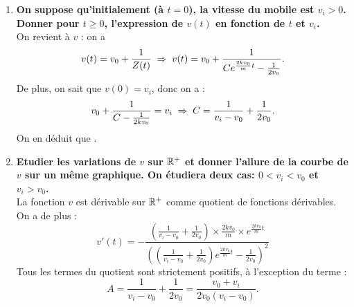 \documentclass[a4paper, 11pt,reqno]{article}
\begin{document}
\begin{correction}
\begin{enumerate}
$$\begin{array}{crcll}
\end{array}$$
On a donc $Z$ solution de l'\'equation diff\'erentielle lin\'eaire d'ordre 1 \`a coefficient constants suivante : 
$$ \ddp Z' - \frac{2kv_0}{m} Z  =  \frac{k}{m}.$$
\begin{itemize}
\item[$\star$] R\'esolution de l'\'equation homog\`ene associ\'ee : $ \ddp Z' - \frac{2kv_0}{m} Z = 0$. La solution est de la forme $Z_h(t) = C e^{\frac{2kv_0}{m}t}$, avec $C\in \R$. %
\item[$\star$] Recherche d'une solution particuli\`ere. Le second membre est constant, on cherche une solution sous la forme $Z_p(t) = \alpha$. On remplace dans l'\'equation, et on obtient :
$$-\frac{2k v_0}{m} \alpha = \frac{k}{m} \; \Rightarrow \; \alpha = -\frac{1}{2v_0}.$$
\item[$\star$] On en d\'eduit que la solution g\'en\'erale est donn\'ee par , avec $C \in \R$.
\end{itemize}
\item \textbf{On suppose qu'initialement (\`a $t=0$), la vitesse du mobile est $v_i>0$. Donner pour $t\geq 0$, l'expression de $v(t)$ en fonction de $t$ et $v_i$.}\\
On revient \`a $v$ : on a 
$$v(t) = v_0 + \displaystyle \frac{1}{Z(t)} \; \Rightarrow \; v(t) = v_0 + \frac{1}{C e^{\frac{2kv_0}{m}t} - \frac{1}{2v_0}}.$$
De plus, on sait que $v(0)= v_i$, donc on a :
$$v_0 + \frac{1}{C - \frac{1}{2kv_0}} = v_i \; \Rightarrow \; C = \displaystyle \frac{1}{v_i-v_0} + \frac{1}{2v_0}.$$
On en d\'eduit que .
\item \textbf{Etudier les variations de $v$ sur $\mathbb{R}^+$ et donner l'allure de la courbe de $v$ sur un m\^eme graphique. On \'etudiera deux cas: $0<v_i<v_0$ et $v_i>v_0$.}\\
La fonction $v$ est d\'erivable sur $\mathbb{R}^+$ comme quotient de fonctions d\'erivables. On a de plus :
$$v'(t) = - \frac{\left(\frac{1}{v_i-v_0} + \frac{1}{2v_0}\right) \times\frac{2kv_0}{m} \times e^{\frac{2kv_0}{m}t} }{\left(\left(\frac{1}{v_i-v_0} + \frac{1}{2v_0}\right) e^{\frac{2kv_0}{m}t} - \frac{1}{2v_0}\right)^2}$$
Tous les termes du quotient sont strictement positifs, \`a l'exception du terme :
$$A = \frac{1}{v_i-v_0} + \frac{1}{2v_0} = \frac{v_0+v_i}{2v_0 (v_i-v_0)}.$$

\end{enumerate}
\end{correction}
\end{document}
